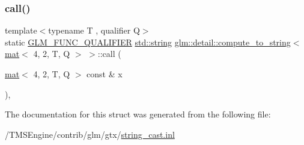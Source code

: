 \subsubsection{\texorpdfstring{call()}{call()}}
{\footnotesize\ttfamily template$<$typename T , qualifier Q$>$ \\
static \hyperlink{setup_8hpp_a33fdea6f91c5f834105f7415e2a64407}{G\+L\+M\+\_\+\+F\+U\+N\+C\+\_\+\+Q\+U\+A\+L\+I\+F\+I\+ER} \hyperlink{_s_d_l__opengl__glext_8h_ae84541b4f3d8e1ea24ec0f466a8c568b}{std\+::string} \hyperlink{structglm_1_1detail_1_1compute__to__string}{glm\+::detail\+::compute\+\_\+to\+\_\+string}$<$ \hyperlink{structglm_1_1mat}{mat}$<$ 4, 2, T, Q $>$ $>$\+::call (\begin{DoxyParamCaption}\item[{\hyperlink{structglm_1_1mat}{mat}$<$ 4, 2, T, Q $>$ const \&}]{x }\end{DoxyParamCaption})\hspace{0.3cm}{\ttfamily [inline]}, {\ttfamily [static]}}



The documentation for this struct was generated from the following file\+:\begin{DoxyCompactItemize}
\item 
/\+T\+M\+S\+Engine/contrib/glm/gtx/\hyperlink{string__cast_8inl}{string\+\_\+cast.\+inl}\end{DoxyCompactItemize}
